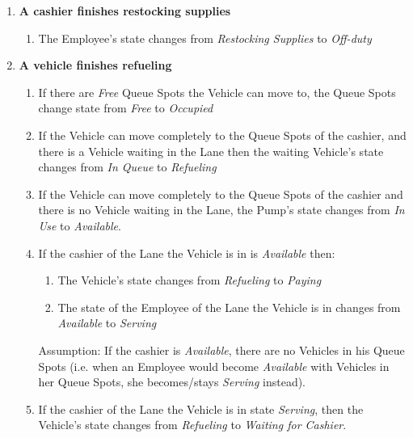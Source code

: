 \begin{enumerate}
	\item \textbf{A cashier finishes restocking supplies}
	\begin{enumerate}
		\item{The Employee's state changes from \textit{Restocking Supplies} to \textit{Off-duty}}
	\end{enumerate}
	
	\item \textbf{A vehicle finishes refueling}
	\begin{enumerate}
		\item If there are \textit{Free} Queue Spots the Vehicle can move to, the Queue Spots change state from \textit{Free} to \textit{Occupied}
		\item If the Vehicle can move completely to the Queue Spots of the cashier, and there is a Vehicle waiting in the Lane then the waiting Vehicle's state changes from \textit{In Queue} to \textit{Refueling}
		\item If the Vehicle can move completely to the Queue Spots of the cashier and there is no Vehicle waiting in the Lane, the Pump's state changes from \textit{In Use} to \textit{Available}.
		\item If the cashier of the Lane the Vehicle is in is \textit{Available} then:
		\begin{enumerate}
			\item The Vehicle's state changes from \textit{Refueling} to \textit{Paying}
			\item The state of the Employee of the Lane the Vehicle is in changes from \textit{Available} to \textit{Serving}
		\end{enumerate}
		Assumption: If the cashier is \textit{Available}, there are no Vehicles in his Queue Spots (i.e. when an Employee would become \textit{Available} with Vehicles in her Queue Spots, she becomes/stays \textit{Serving} instead).
		\item If the cashier of the Lane the Vehicle is in state \textit{Serving}, then the Vehicle's state changes from \textit{Refueling} to \textit{Waiting for Cashier}.
	\end{enumerate}
	

\end{enumerate}
